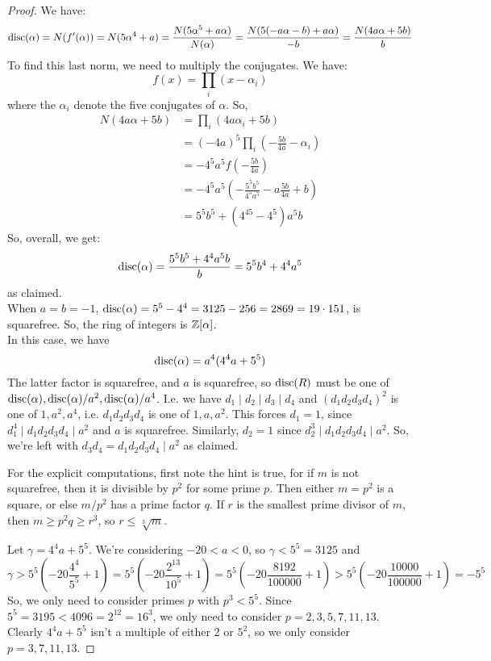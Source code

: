 \begin{proof} 
    We have:
    \[ \operatorname{disc}(\alpha) = N(f'(\alpha)) = N(5\alpha^4+a) = \frac{N(5\alpha^5+a\alpha)}{N(\alpha)} = \frac{N(5(-a\alpha-b)+a\alpha)}{-b} = \frac{N(4a\alpha+5b)}{b} \]
    To find this last norm, we need to multiply the conjugates. We have:
    \[ f(x) = \prod_i (x-\alpha_i) \]
    where the $\alpha_i$ denote the five conjugates of $\alpha$. So,
    \begin{align*}
    N(4a\alpha+5b)
        &= \prod_i (4a\alpha_i+5b) \\
        &= (-4a)^5\prod_i \left(-\frac{5b}{4a} - \alpha_i\right) \\
        &= -4^5a^5f\left(-\frac{5b}{4a}\right) \\
        &= -4^5a^5\left(-\frac{5^5b^5}{4^5a^5}-a\frac{5b}{4a}+b\right) \\
        &= 5^5b^5 + (4^45-4^5)a^5b
    \end{align*}
    So, overall, we get:
    \[ \operatorname{disc}(\alpha) = \frac{5^5b^5 + 4^4a^5b}{b} = 5^5b^4 + 4^4a^5 \]
    as claimed. \\

    When $a=b=-1$, $\operatorname{disc}(\alpha) = 5^5-4^4 = 3125 - 256 = 2869 = 19 \cdot 151$, is squarefree. So, the ring of integers is $\mathbb{Z}[\alpha]$. \\

    In this case, we have
    \[ \operatorname{disc}(\alpha) = a^4(4^4a+5^5) \]
    The latter factor is squarefree, and $a$ is squarefree, so $\operatorname{disc}(R)$ must be one of $\operatorname{disc}(\alpha),\operatorname{disc}(\alpha)/a^2,\operatorname{disc}(\alpha)/a^4$. I.e. we have $d_1 \mid d_2 \mid d_3 \mid d_4$ and $(d_1d_2d_3d_4)^2$ is one of $1,a^2,a^4$, i.e. $d_1d_2d_3d_4$ is one of $1,a,a^2$. This forces $d_1 = 1$, since $d_1^4 \mid d_1d_2d_3d_4 \mid a^2$ and $a$ is squarefree. Similarly, $d_2 = 1$ since $d_2^3 \mid d_1d_2d_3d_4 \mid a^2$. So, we're left with $d_3d_4 = d_1d_2d_3d_4 \mid a^2$ as claimed.

    For the explicit computations, first note the hint is true, for if $m$ is not squarefree, then it is divisible by $p^2$ for some prime $p$. Then either $m = p^2$ is a square, or else $m/p^2$ has a prime factor $q$. If $r$ is the smallest prime divisor of $m$, then $m \geq p^2q \geq r^3$, so $r \leq \sqrt[3]{m}$.

    Let $\gamma = 4^4a+5^5$. We're considering $-20 < a < 0$, so $\gamma < 5^5 = 3125$ and
    \[ \gamma > 5^5\left(-20\frac{4^4}{5^5}+1\right) = 5^5\left(-20\frac{2^{13}}{10^5}+1\right) = 5^5\left(-20\frac{8192}{100000}+1\right) > 5^5\left(-20\frac{10000}{100000}+1\right) = -5^5 \]
    So, we only need to consider primes $p$ with $p^3 < 5^5$. Since $5^5 = 3195 < 4096 = 2^{12} = 16^3$, we only need to consider $p=2,3,5,7,11,13$. Clearly $4^4a+5^5$ isn't a multiple of either 2 or $5^2$, so we only consider $p=3,7,11,13$.


\end{proof}
